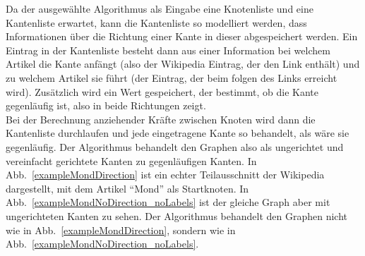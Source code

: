 \documentclass[12pt, a4paper]{article}
\begin{document}
Da der ausgewählte Algorithmus als Eingabe eine Knotenliste und eine Kantenliste erwartet, kann die Kantenliste so modelliert werden, dass Informationen über die Richtung einer Kante in dieser abgespeichert werden. Ein Eintrag in der Kantenliste besteht dann aus einer Information bei welchem Artikel die Kante anfängt (also der Wikipedia Eintrag, der den Link enthält) und zu welchem Artikel sie führt (der Eintrag, der beim folgen des Links erreicht wird). Zusätzlich wird ein Wert gespeichert, der bestimmt, ob die Kante gegenläufig ist, also in beide Richtungen zeigt.\\

Bei der Berechnung anziehender Kräfte zwischen Knoten wird dann die Kantenliste durchlaufen und jede eingetragene Kante so behandelt, als wäre sie gegenläufig. Der Algorithmus behandelt den Graphen also als ungerichtet und vereinfacht gerichtete Kanten zu gegenläufigen Kanten. In Abb.~\ref{exampleMondDirection} ist ein echter Teilausschnitt der Wikipedia dargestellt, mit dem Artikel "`Mond"' als Startknoten. In Abb.~\ref{exampleMondNoDirection_noLabels} ist der gleiche Graph aber mit ungerichteten Kanten zu sehen. Der Algorithmus behandelt den Graphen nicht wie in Abb.~\ref{exampleMondDirection}, sondern wie in Abb.~\ref{exampleMondNoDirection_noLabels}.\\
\end{document}
